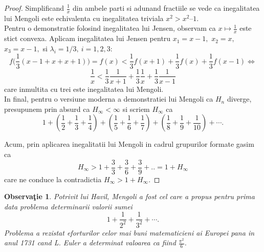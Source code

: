 \documentclass[a4paper,12pt,oneside]{report}
\newtheorem{remark}{Observa\c{t}ie}
\begin{document}
\begin{proof}
Simplificand \(\frac{1}{x}\) din ambele parti si adunand fractiile se vede ca inegalitatea lui Mengoli este echivalenta cu inegalitatea  triviala \(x^{2} >  x^{2} – 1\). \\
Pentru o demonstratie folosind inegalitatea lui Jensen, observam ca \(x \mapsto \frac{1}{x}\) este stict convexa. Aplicam inegalitatea lui Jensen pentru $x_1=x-1,$ $x_2=x,$ $x_3=x-1,$ si $\lambda_i=1/3,~i=1, 2, 3:$
\[
f\biggl(\frac{1}{3}(x-1+x+x+1)\biggr)=f(x)<\frac{1}{3}f(x+1)+\frac{1}{3}f(x)+\frac{1}{3}f(x-1)\Leftrightarrow
\]
\[
\frac{1}{x}<\frac{1}{3}\frac{1}{x+1}+\frac{1}{3}\frac{1}{x}+\frac{1}{3}\frac{1}{x-1}
\]
care inmultita cu trei este inegalitatea lui Mengoli.\\
In final, pentru o versiune moderna a demonstratiei lui Mengoli ca \(H_{n}\) diverge, presupunem prin absurd ca \(H_{\infty }< \infty\) si scriem \(H_{\infty }\) ca
\begin{displaymath}
  1 + \left ( \frac{1}{2} + \frac{1}{3} + \frac{1}{4} \right ) + \left ( \frac{1}{5} + \frac{1}{6} + \frac{1}{7} \right ) + \left ( \frac{1}{8} + \frac{1}{9} +\frac{1}{10} \right )+\cdots.
\end{displaymath}

Acum, prin aplicarea inegalitatii lui Mengoli in cadrul grupurilor formate gasim ca
\[
H_{\infty }>1 + \frac{3}{3} + \frac{3}{6} + \frac{3}{9} + ..= 1 + H_{\infty }
\]
care ne conduce la contradictia \(H_{\infty } > 1 + H_{\infty }\).
\end{proof}
\begin{remark}
Potrivit lui Havil, Mengoli a fost cel care a propus pentru prima data problema determinarii valorii sumei \[1 + \frac{1}{2^{2}} + \frac{1}{3^{2}} + \cdots.\]
Problema a rezistat eforturilor celor mai buni matematicieni ai Europei pana in anul 1731 cand L. Euler a determinat valoarea ca fiind \(\frac{\pi^{2}}{6}\).
\end{remark}
\end{document}
